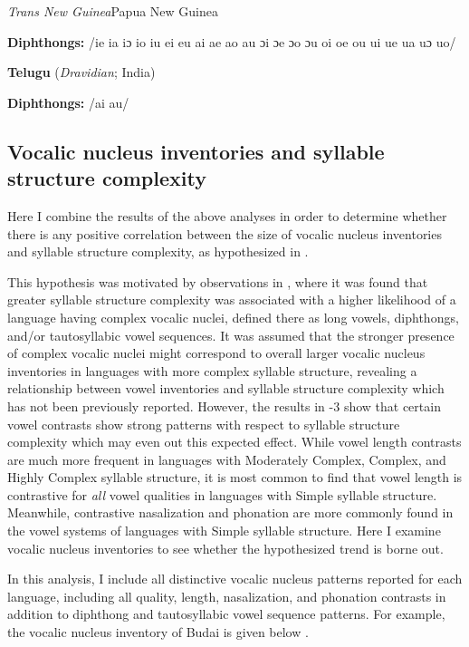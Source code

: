\ea\label{ex:4.17}
 \textit{Trans New Guinea}{Papua New Guinea}

\textbf{Diphthongs:} /ie ia iɔ io iu ei eu ai ae ao au ɔi ɔe ɔo ɔu oi oe ou ui ue ua uɔ uo/
\z

\ea\label{ex:4.18}
  \textbf{Telugu} (\textit{Dravidian}; India)

\textbf{Diphthongs:} /ai au/
\z

\subsection{Vocalic nucleus inventories and syllable structure complexity}\label{sec:4.3.5}

  Here I combine the results of the above analyses in order to determine whether there is any positive correlation between the size of vocalic nucleus inventories and syllable structure complexity, as hypothesized in .

  This hypothesis was motivated by observations in , where it was found that greater syllable structure complexity was associated with a higher likelihood of a language having complex vocalic nuclei, defined there as long vowels, diphthongs, and/or tautosyllabic vowel sequences. It was assumed that the stronger presence of complex vocalic nuclei might correspond to overall larger vocalic nucleus inventories in languages with more complex syllable structure, revealing a relationship between vowel inventories and syllable structure complexity which has not been previously reported. However, the results in -3 show that certain vowel contrasts show strong patterns with respect to syllable structure complexity which may even out this expected effect. While vowel length contrasts are much more frequent in languages with Moderately Complex, Complex, and Highly Complex syllable structure, it is most common to find that vowel length is contrastive for \textit{all} vowel qualities in languages with Simple syllable structure. Meanwhile, contrastive nasalization and phonation are more commonly found in the vowel systems of languages with Simple syllable structure. Here I examine vocalic nucleus inventories to see whether the hypothesized trend is borne out.

  In this analysis, I include all distinctive vocalic nucleus patterns reported for each language, including all quality, length, nasalization, and phonation contrasts in addition to diphthong and tautosyllabic vowel sequence patterns. For example, the vocalic nucleus inventory of Budai  is given below .

